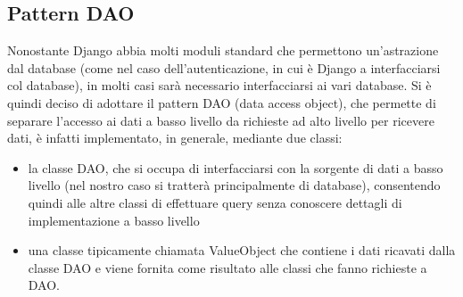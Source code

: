 \subsection{Pattern DAO}
Nonostante Django abbia molti moduli standard che permettono un'astrazione dal database (come nel caso dell'autenticazione, in cui è Django a interfacciarsi col database), in molti casi sarà necessario interfacciarsi ai vari database. Si è quindi deciso di adottare il pattern DAO (data access object), che permette di separare l'accesso ai dati a basso livello da richieste ad alto livello per ricevere dati, è infatti implementato, in generale, mediante due classi:
\begin{itemize}
\item la classe DAO, che si occupa di interfacciarsi con la sorgente di dati a basso livello (nel nostro caso si tratterà principalmente di database), consentendo quindi alle altre classi di effettuare query senza conoscere dettagli di implementazione a basso livello
\item una classe tipicamente chiamata ValueObject che contiene i dati ricavati dalla classe DAO e viene fornita come risultato alle classi che fanno richieste a DAO.
\end{itemize}
